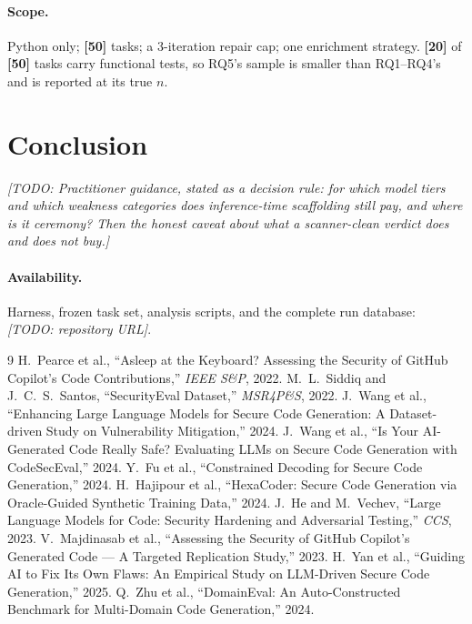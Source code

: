 \documentclass[10pt,conference]{article}
\newcommand{\PLACEHOLDER}[1]{{\color{placeholderred}\textbf{[#1]}}}
\newcommand{\TODO}[1]{{\color{placeholderred}\textit{[TODO: #1]}}}
\begin{document}
\paragraph{Scope.} Python only; \PLACEHOLDER{50} tasks; a 3-iteration repair cap;
one enrichment strategy. \PLACEHOLDER{20} of \PLACEHOLDER{50} tasks carry
functional tests, so RQ5's sample is smaller than RQ1--RQ4's and is reported at
its true $n$.

\section{Conclusion}

\TODO{Practitioner guidance, stated as a decision rule: for which model tiers and
which weakness categories does inference-time scaffolding still pay, and where is
it ceremony? Then the honest caveat about what a scanner-clean verdict does and
does not buy.}

\paragraph{Availability.} Harness, frozen task set, analysis scripts, and the
complete run database: \TODO{repository URL}.

\begin{thebibliography}{9}\small
{} H.~Pearce et al., ``Asleep at the Keyboard? Assessing
  the Security of GitHub Copilot's Code Contributions,'' \emph{IEEE S\&P}, 2022.
 M.~L.~Siddiq and J.~C.~S.~Santos,
  ``SecurityEval Dataset,'' \emph{MSR4P\&S}, 2022.
 J.~Wang et al., ``Enhancing Large Language Models for
  Secure Code Generation: A Dataset-driven Study on Vulnerability Mitigation,''
  2024.
 J.~Wang et al., ``Is Your AI-Generated Code Really
  Safe? Evaluating LLMs on Secure Code Generation with CodeSecEval,'' 2024.
 Y.~Fu et al., ``Constrained Decoding for Secure Code
  Generation,'' 2024.
 H.~Hajipour et al., ``HexaCoder: Secure Code
  Generation via Oracle-Guided Synthetic Training Data,'' 2024.
 J.~He and M.~Vechev, ``Large Language Models for Code:
  Security Hardening and Adversarial Testing,'' \emph{CCS}, 2023.
 V.~Majdinasab et al., ``Assessing the
  Security of GitHub Copilot's Generated Code --- A Targeted Replication Study,''
  2023.
 H.~Yan et al., ``Guiding AI to Fix Its Own Flaws: An
  Empirical Study on LLM-Driven Secure Code Generation,'' 2025.
 Q.~Zhu et al., ``DomainEval: An Auto-Constructed
  Benchmark for Multi-Domain Code Generation,'' 2024.
\end{thebibliography}
\end{document}
